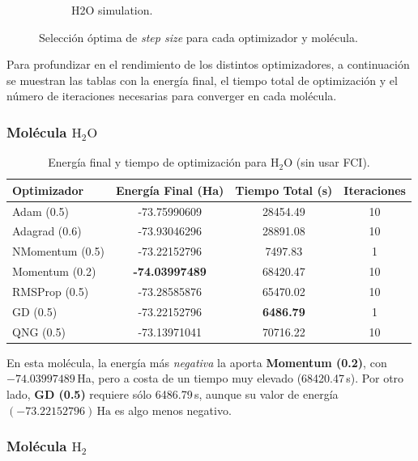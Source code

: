 \begin{figure}[H]
\begin{subfigure}{0.32\textwidth}
    \caption{H2O simulation.}
    \label{fig:subimage3}
  \end{subfigure}
  \caption{Selección óptima de \emph{step size} para cada optimizador y molécula.}
  \label{fig:three_images}
\end{figure}

Para profundizar en el rendimiento de los distintos optimizadores, a continuación se muestran las tablas con la energía final, el tiempo total de optimización y el número de iteraciones necesarias para converger en cada molécula.

\subsubsection{Molécula \(\mathrm{H_2O}\)}

\begin{table}[H]
\centering
\caption{Energía final y tiempo de optimización para \(\mathrm{H_2O}\) (sin usar FCI).}
\begin{tabular}{lccc}
\toprule
\textbf{Optimizador} & \textbf{Energía Final (Ha)} & \textbf{Tiempo Total (s)} & \textbf{Iteraciones}\\
\midrule
Adam (0.5)       & -73.75990609 & 28454.49 & 10 \\
Adagrad (0.6)    & -73.93046296 & 28891.08 & 10 \\
NMomentum (0.5)  & -73.22152796 & 7497.83  &  1 \\
Momentum (0.2)   & \textbf{-74.03997489} & 68420.47 & 10 \\
RMSProp (0.5)    & -73.28585876 & 65470.02 & 10 \\
GD (0.5)         & -73.22152796 & \textbf{6486.79}  &  1 \\
QNG (0.5)        & -73.13971041 & 70716.22 & 10 \\
\bottomrule
\end{tabular}
\end{table}

En esta molécula, la energía más \emph{negativa} la aporta \textbf{Momentum (0.2)}, con \(-74.03997489\)\,Ha, pero a costa de un tiempo muy elevado (68420.47\,s). Por otro lado, \textbf{GD (0.5)} requiere sólo 6486.79\,s, aunque su valor de energía \((-73.22152796)\,\mathrm{Ha}\) es algo menos negativo.

\subsubsection{Molécula \(\mathrm{H_2}\)}

